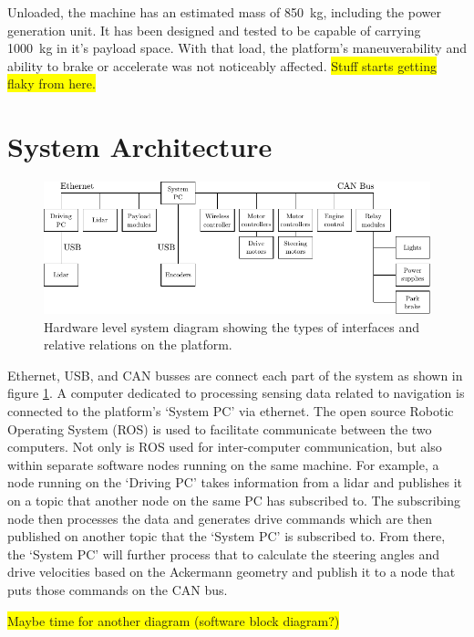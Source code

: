 \documentclass[preprint,authoryear,12pt]{elsarticle}
\begin{document}
    Unloaded, the machine has an estimated mass of \SI{850}{\kilo\gram}, including the power generation unit.
    It has been designed and tested to be capable of carrying \SI{1000}{\kilo\gram} in it's payload space.
    With that load, the platform's maneuverability and ability to brake or accelerate was not noticeably affected.
    \colorbox{yellow}{Stuff starts getting flaky from here.}

\section{System Architecture}
\label{sect:hardware}

    \begin{figure}[htb]
        \centering
        \includegraphics[width=\linewidth]{imgs/system_diagram/diagram_v3.pdf}
        \caption{Hardware level system diagram showing the types of interfaces and relative relations on the platform.}
        \label{fig:system_diagram}
    \end{figure}
    Ethernet, USB, and CAN busses are connect each part of the system as shown in figure \ref{fig:system_diagram}.
    A computer dedicated to processing sensing data related to navigation is connected to the platform's `System PC' via ethernet.
    The open source Robotic Operating System (ROS) is used to facilitate communicate between the two computers.
    Not only is ROS used for inter-computer communication, but also within separate software nodes running on the same machine.
    For example, a node running on the `Driving PC' takes information from a lidar and publishes it on a topic that another node on the same PC has subscribed to.
    The subscribing node then processes the data and generates drive commands which are then published on another topic that the `System PC' is subscribed to.
    From there, the `System PC' will further process that to calculate the steering angles and drive velocities based on the Ackermann geometry and publish it to a node that puts those commands on the CAN bus.

    \colorbox{yellow}{Maybe time for another diagram (software block diagram?)}
\end{document}
